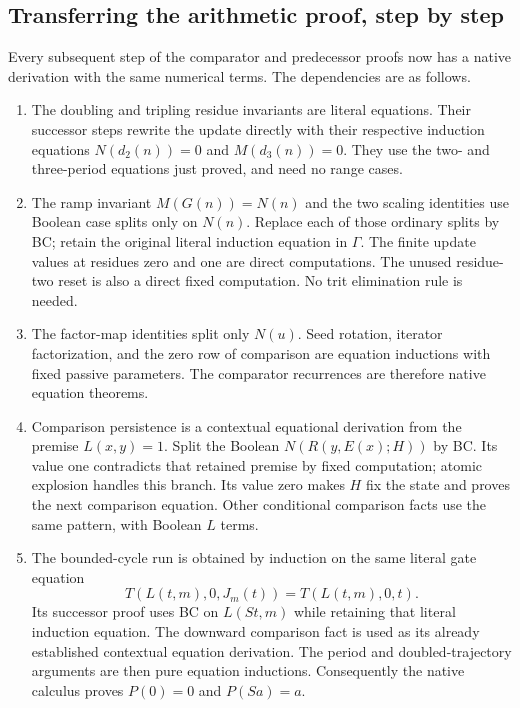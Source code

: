 \subsection{Transferring the arithmetic proof, step by step}

Every subsequent step of the comparator and predecessor proofs now has
a native derivation with the same numerical terms.
The dependencies are as follows.

\begin{enumerate}
\item The doubling and tripling residue invariants are literal equations.
Their successor steps rewrite the update directly with their respective
induction equations $N(d_2(n))=0$ and $M(d_3(n))=0$.  They use the
two- and three-period equations just proved, and need no range cases.

\item The ramp invariant $M(G(n))=N(n)$ and the two scaling identities
use Boolean case splits only on $N(n)$.  Replace each of those ordinary
splits by BC; retain the original literal induction equation in $\Gamma$.
The finite update values at residues zero and one are direct computations.
The unused residue-two reset is also a direct fixed computation.
No trit elimination rule is needed.

\item The factor-map identities split only $N(u)$.  Seed rotation,
iterator factorization, and the zero row of comparison are equation
inductions with fixed passive parameters.  The comparator recurrences
are therefore native equation theorems.

\item Comparison persistence is a contextual equational derivation from
the premise $L(x,y)=1$.  Split the Boolean $N(R(y,E(x);H))$ by BC.
Its value one contradicts that retained premise by fixed computation;
atomic explosion handles this branch.  Its value zero makes $H$ fix the
state and proves the next comparison equation.  Other conditional
comparison facts use the same pattern, with Boolean $L$ terms.

\item The bounded-cycle run is obtained by induction on the same literal
gate equation
\[
 T(L(t,m),0,J_m(t))=T(L(t,m),0,t).
\]
Its successor proof uses BC on $L(St,m)$ while retaining that literal
induction equation.  The downward comparison fact is used as its
already established contextual equation derivation.  The period and
doubled-trajectory arguments are then pure equation inductions.
Consequently the native calculus proves $P(0)=0$ and $P(Sa)=a$.
\end{enumerate}

